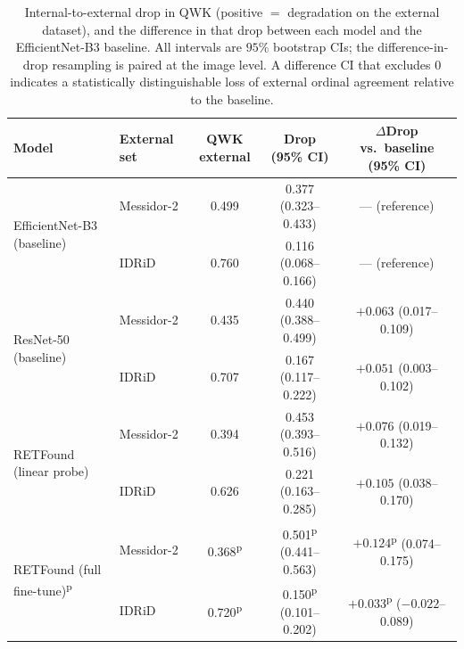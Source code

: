 \documentclass[journal]{IEEEtran}
\newcommand{\pv}[1]{#1\textsuperscript{p}}
\renewcommand{\_}{\origunderscore\allowbreak}
\begin{document}
\begin{table}[!t]
\centering\footnotesize
\caption{Internal-to-external drop in QWK (positive $=$ degradation on the
external dataset), and the difference in that drop between each model and the
EfficientNet-B3 baseline. All intervals are $95\%$ bootstrap CIs; the
difference-in-drop resampling is paired at the image level. A difference CI that
excludes $0$ indicates a statistically distinguishable loss of external ordinal
agreement relative to the baseline.}
\label{tab:drop}
\setlength{\tabcolsep}{5pt}
\begin{tabular}{llccc}
\toprule
Model & External set & QWK external & Drop (95\% CI) & $\Delta$Drop vs.\ baseline (95\% CI) \\
\midrule
\multirow{2}{*}{EfficientNet-B3 (baseline)}
 & Messidor-2 & 0.499 & 0.377 (0.323--0.433) & --- (reference) \\
 & IDRiD      & 0.760 & 0.116 (0.068--0.166) & --- (reference) \\
\midrule
\multirow{2}{*}{ResNet-50 (baseline)}
 & Messidor-2 & 0.435 & 0.440 (0.388--0.499) & $+0.063$ (0.017--0.109) \\
 & IDRiD      & 0.707 & 0.167 (0.117--0.222) & $+0.051$ (0.003--0.102) \\
\midrule
\multirow{2}{*}{RETFound (linear probe)}
 & Messidor-2 & 0.394 & 0.453 (0.393--0.516) & $+0.076$ (0.019--0.132) \\
 & IDRiD      & 0.626 & 0.221 (0.163--0.285) & $+0.105$ (0.038--0.170) \\
\midrule
\multirow{2}{*}{RETFound (full fine-tune)\textsuperscript{p}}
 & Messidor-2 & \pv{0.368} & \pv{0.501} (0.441--0.563) & \pv{$+0.124$} (0.074--0.175) \\
 & IDRiD      & \pv{0.720} & \pv{0.150} (0.101--0.202) & \pv{$+0.033$} ($-0.022$--0.089) \\
\bottomrule
\end{tabular}
\end{table}
\end{document}
